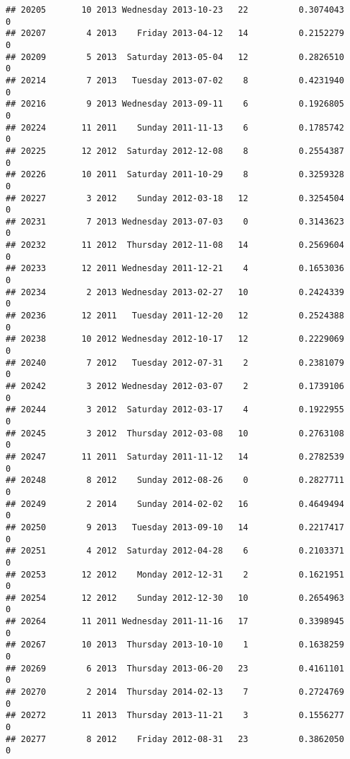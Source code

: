 \documentclass[
]{article}
\begin{document}
\begin{verbatim}
## 20205       10 2013 Wednesday 2013-10-23   22          0.3074043             0
## 20207        4 2013    Friday 2013-04-12   14          0.2152279             0
## 20209        5 2013  Saturday 2013-05-04   12          0.2826510             0
## 20214        7 2013   Tuesday 2013-07-02    8          0.4231940             0
## 20216        9 2013 Wednesday 2013-09-11    6          0.1926805             0
## 20224       11 2011    Sunday 2011-11-13    6          0.1785742             0
## 20225       12 2012  Saturday 2012-12-08    8          0.2554387             0
## 20226       10 2011  Saturday 2011-10-29    8          0.3259328             0
## 20227        3 2012    Sunday 2012-03-18   12          0.3254504             0
## 20231        7 2013 Wednesday 2013-07-03    0          0.3143623             0
## 20232       11 2012  Thursday 2012-11-08   14          0.2569604             0
## 20233       12 2011 Wednesday 2011-12-21    4          0.1653036             0
## 20234        2 2013 Wednesday 2013-02-27   10          0.2424339             0
## 20236       12 2011   Tuesday 2011-12-20   12          0.2524388             0
## 20238       10 2012 Wednesday 2012-10-17   12          0.2229069             0
## 20240        7 2012   Tuesday 2012-07-31    2          0.2381079             0
## 20242        3 2012 Wednesday 2012-03-07    2          0.1739106             0
## 20244        3 2012  Saturday 2012-03-17    4          0.1922955             0
## 20245        3 2012  Thursday 2012-03-08   10          0.2763108             0
## 20247       11 2011  Saturday 2011-11-12   14          0.2782539             0
## 20248        8 2012    Sunday 2012-08-26    0          0.2827711             0
## 20249        2 2014    Sunday 2014-02-02   16          0.4649494             0
## 20250        9 2013   Tuesday 2013-09-10   14          0.2217417             0
## 20251        4 2012  Saturday 2012-04-28    6          0.2103371             0
## 20253       12 2012    Monday 2012-12-31    2          0.1621951             0
## 20254       12 2012    Sunday 2012-12-30   10          0.2654963             0
## 20264       11 2011 Wednesday 2011-11-16   17          0.3398945             0
## 20267       10 2013  Thursday 2013-10-10    1          0.1638259             0
## 20269        6 2013  Thursday 2013-06-20   23          0.4161101             0
## 20270        2 2014  Thursday 2014-02-13    7          0.2724769             0
## 20272       11 2013  Thursday 2013-11-21    3          0.1556277             0
## 20277        8 2012    Friday 2012-08-31   23          0.3862050             0

\end{verbatim}
\end{document}
